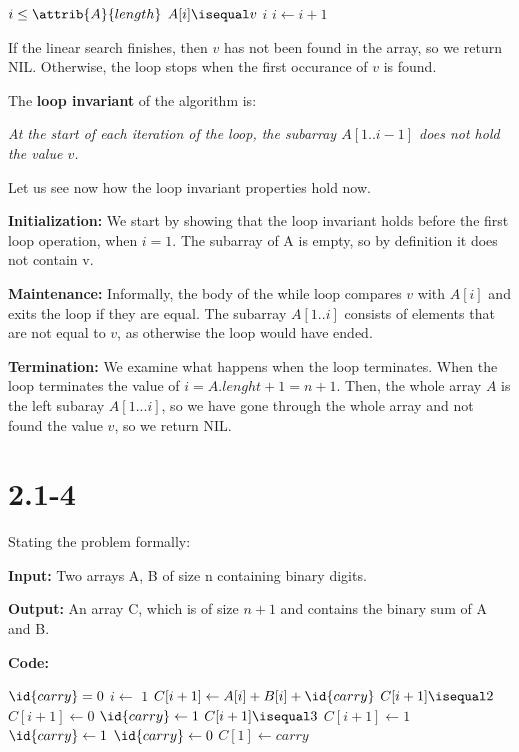 \documentclass{article}
\begin{document}
\begin{codebox}
  \li \While $i \leq \attrib{A}{length}$
  \li \Do
        \If $A[i] \isequal v$
  \li   \Then
          \Return $i$
        \End
  \li     $i \gets i + 1$
      \End
  \li \Return {}
\end{codebox}

If the linear search finishes, then $v$ has not been found in the array, so we return NIL. Otherwise, the loop stops when the first occurance of $v$ is found.

The \textbf{loop invariant} of the algorithm is: 

\begin{center} \textit{
  At the start of each iteration of the loop, the subarray $A[1..i-1]$ does not hold the value $v$. }
\end{center}

Let us see now how the loop invariant properties hold now.

\textbf{Initialization:} We start by showing that the loop invariant holds before the first loop operation, when $i = 1$. The subarray of A is empty, so by definition it does not contain v. 

\textbf{Maintenance:} Informally, the body of the while loop compares $v$ with $A[i]$ and exits the loop if they are equal. The subarray $A[1..i]$ consists of elements that are not equal to $v$, as otherwise the loop would have ended.

\textbf{Termination:} We examine what happens when the loop terminates. When the loop terminates the value of $i = A.lenght + 1 = n + 1$. Then, the whole array $A$ is the left subaray $A[1...i]$, so we have gone through the whole array and not found the value $v$, so we return NIL.

\section*{2.1-4}

Stating the problem formally:

\textbf{Input:} Two arrays A, B of size n containing binary digits.

\textbf{Output:} An array C, which is of size $n+1$ and contains the binary sum of A and B.

\textbf{Code:}

\begin{codebox}
  \li $\id{carry} = 0$ 
  \li \For $i \gets$  \Downto $1$
  \li \Do
        $C[i+1] \gets A[i] + B[i] + \id{carry}$
  \li   \If $C[i+1] \isequal 2$ 
  \li   \Then
          $C[i+1] \gets 0$
  \li     $\id{carry} \gets 1$
  \li   \ElseIf $C[i+1] \isequal 3$  
  \li   \Then
          $C[i+1] \gets 1$
  \li     $\id{carry} \gets 1$
  \li   \Else
  \li     $\id{carry} \gets 0$
        \End
      \End
  \li $C[1] \gets carry$
\end{codebox}
\end{document}

